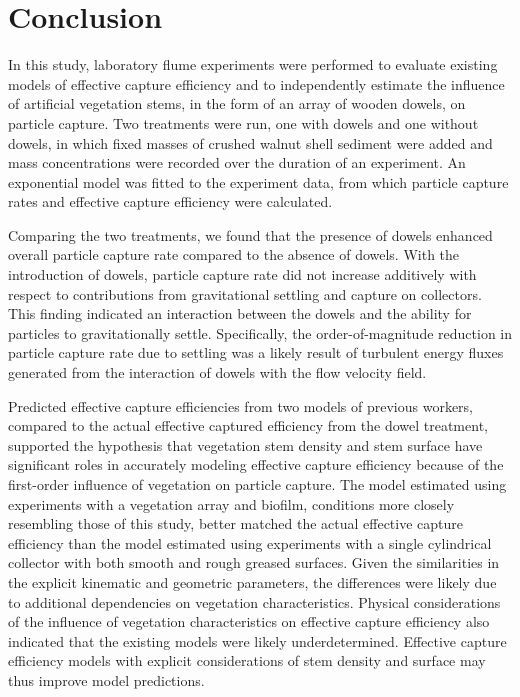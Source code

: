 \documentclass[12pt]{article}
\begin{document}
\section{Conclusion}

In this study, laboratory flume experiments were performed to evaluate existing models of effective capture efficiency and to independently estimate the influence of artificial vegetation stems, in the form of an array of wooden dowels, on particle capture. Two treatments were run, one with dowels and one without dowels, in which fixed masses of crushed walnut shell sediment were added and mass concentrations were recorded over the duration of an experiment. An exponential model was fitted to the experiment data, from which particle capture rates and effective capture efficiency were calculated.

Comparing the two treatments, we found that the presence of dowels enhanced overall particle capture rate compared to the absence of dowels. With the introduction of dowels, particle capture rate did not increase additively with respect to contributions from gravitational settling and capture on collectors. This finding indicated an interaction between the dowels and the ability for particles to gravitationally settle. Specifically, the order-of-magnitude reduction in particle capture rate due to settling was a likely result of turbulent energy fluxes generated from the interaction of dowels with the flow velocity field.

Predicted effective capture efficiencies from two models of previous workers, compared to the actual effective captured efficiency from the dowel treatment, supported the hypothesis that vegetation stem density and stem surface have significant roles in accurately modeling effective capture efficiency because of the first-order influence of vegetation on particle capture. The model estimated using experiments with a vegetation array and biofilm, conditions more closely resembling those of this study, better matched the actual effective capture efficiency than the model estimated using experiments with a single cylindrical collector with both smooth and rough greased surfaces. Given the similarities in the explicit kinematic and geometric parameters, the differences were likely due to additional dependencies on vegetation characteristics. Physical considerations of the influence of vegetation characteristics on effective capture efficiency also indicated that the existing models were likely underdetermined. Effective capture efficiency models with explicit considerations of stem density and surface may thus improve model predictions.
\end{document}
